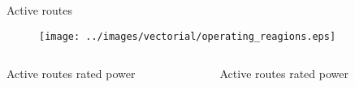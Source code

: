 \begin{frame}{Active routes}

  \begin{figure}[H]
    \centering
    \texttt{[image: ../images/vectorial/operating\_reagions.eps]}
  \end{figure}

  \begin{columns}
    \begin{column}{0.4\textwidth}
      Active routes  rated power
        \begin{center}
        \end{center}
    \end{column}
    \begin{column}{0.4\textwidth}
      Active routes  rated power
        \begin{center}
        \end{center}
    \end{column}
  \end{columns}
\end{frame}

                                                    
